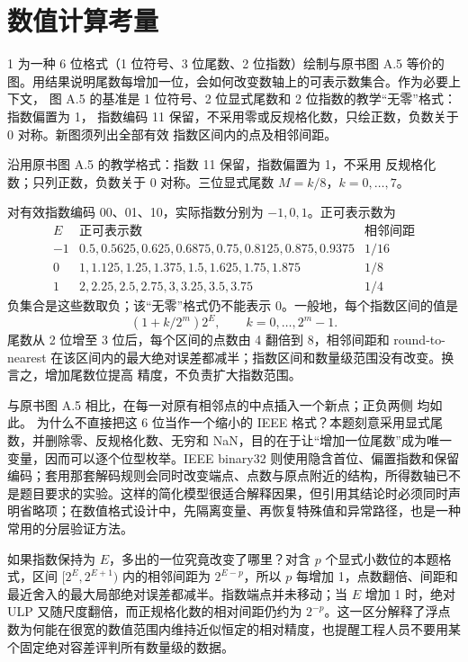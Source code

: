 \chapter{数值计算考量}

\begin{solutionexercise}{1}
\problemheading 为一种 6 位格式（1 位符号、3 位尾数、2 位指数）绘制与原书图 A.5
等价的图。用结果说明尾数每增加一位，会如何改变数轴上的可表示数集合。作为必要上下文，
图 A.5 的基准是 1 位符号、2 位显式尾数和 2 位指数的教学“无零”格式：指数偏置为 1，
指数编码 11 保留，不采用零或反规格化数，只绘正数，负数关于 0 对称。新图须列出全部有效
指数区间内的点及相邻间距。

\approachheading 沿用原书图 A.5 的教学格式：指数 11 保留，指数偏置为 1，不采用
反规格化数；只列正数，负数关于 0 对称。三位显式尾数 $M=k/8$，$k=0,\ldots,7$。

\answerheading 对有效指数编码 00、01、10，实际指数分别为 $-1,0,1$。正可表示数为
\[
\begin{array}{c|l|c}
E&\text{正可表示数}&\text{相邻间距}\\ \hline
-1&0.5,0.5625,0.625,0.6875,0.75,0.8125,0.875,0.9375&1/16\\
0&1,1.125,1.25,1.375,1.5,1.625,1.75,1.875&1/8\\
1&2,2.25,2.5,2.75,3,3.25,3.5,3.75&1/4
\end{array}
\]
负集合是这些数取负；该“无零”格式仍不能表示 0。一般地，每个指数区间的值是
\[
  (1+k/2^m)2^E,\qquad k=0,\ldots,2^m-1.
\]
尾数从 2 位增至 3 位后，每个区间的点数由 4 翻倍到 8，相邻间距和 round-to-nearest
在该区间内的最大绝对误差都减半；指数区间和数量级范围没有改变。换言之，增加尾数位提高
精度，不负责扩大指数范围。

\conclusionheading 与原书图 A.5 相比，在每一对原有相邻点的中点插入一个新点；正负两侧
均如此。
\discussionheading
{}
为什么不直接把这 6 位当作一个缩小的 IEEE 格式？本题刻意采用显式尾数，并删除零、反规格化数、无穷和 NaN，目的在于让“增加一位尾数”成为唯一变量，因而可以逐个位型枚举。IEEE binary32 则使用隐含首位、偏置指数和保留编码；套用那套解码规则会同时改变端点、点数与原点附近的结构，所得数轴已不是题目要求的实验。这样的简化模型很适合解释因果，但引用其结论时必须同时声明省略项；在数值格式设计中，先隔离变量、再恢复特殊值和异常路径，也是一种常用的分层验证方法。

如果指数保持为 $E$，多出的一位究竟改变了哪里？对含 $p$ 个显式小数位的本题格式，区间 $[2^E,2^{E+1})$ 内的相邻间距为 $2^{E-p}$，所以 $p$ 每增加 1，点数翻倍、间距和最近舍入的最大局部绝对误差都减半。指数端点并未移动；当 $E$ 增加 1 时，绝对 ULP 又随尺度翻倍，而正规格化数的相对间距仍约为 $2^{-p}$。这一区分解释了浮点数为何能在很宽的数值范围内维持近似恒定的相对精度，也提醒工程人员不要用某个固定绝对容差评判所有数量级的数据。


\end{solutionexercise}
